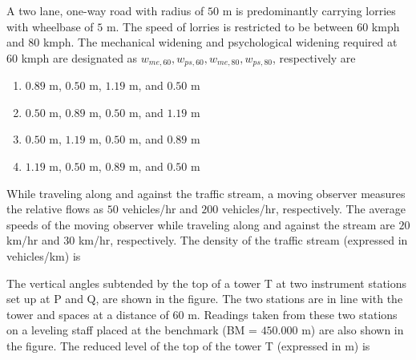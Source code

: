     \item A two lane, one-way road with radius of $50$ m is predominantly carrying lorries with wheelbase of $5$ m. The speed of lorries is restricted to be between $60$ kmph and $80$ kmph. The mechanical widening and psychological widening required at $60$ kmph are designated as $w_{me,60},w_{ps,60},w_{me,80},w_{ps,80}$, respectively are
    \begin{enumerate}
        \item $0.89$ m, $0.50$ m, $1.19$ m, and $0.50$ m
        \item $0.50$ m, $0.89$ m, $0.50$ m, and $1.19$ m
        \item $0.50$ m, $1.19$ m, $0.50$ m, and $0.89$ m
        \item $1.19$ m, $0.50$ m, $0.89$ m, and $0.50$ m
    \end{enumerate}

    \item While traveling along and against the traffic stream, a moving observer measures the relative flows as $50$ vehicles/hr and $200$ vehicles/hr, respectively. The average speeds of the moving observer while traveling along and against the stream are $20$ km/hr and $30$ km/hr, respectively. The density of the traffic stream (expressed in vehicles/km) is \underline{\hspace{2cm}}

    \item The vertical angles subtended by the top of a tower T at two instrument stations set up at P and Q, are shown in the figure. The two stations are in line with the tower and spaces at a distance of $60$ m. Readings taken from these two stations on a leveling staff placed at the benchmark (BM = $450.000$ m) are also shown in the figure. The reduced level of the top of the tower T (expressed in m) is \underline{\hspace{2cm}} 
    
